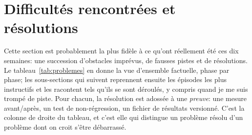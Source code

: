 \documentclass[11pt,a4paper]{article}
\begin{document}
\section{Difficultés rencontrées et résolutions}
\label{sec:problemes}

Cette section est probablement la plus fidèle à ce qu'ont réellement été ces dix semaines: une succession d'obstacles imprévus, de fausses pistes et de résolutions. Le tableau~\ref{tab:problemes} en donne la vue d'ensemble factuelle, phase par phase; les sous-sections qui suivent reprennent ensuite les épisodes les plus instructifs et les racontent tels qu'ils se sont déroulés, y compris quand je me suis trompé de piste. Pour chacun, la résolution est adossée à une \emph{preuve}: une mesure avant/après, un test de non-régression, un fichier de résultats versionné. C'est la colonne de droite du tableau, et c'est elle qui distingue un problème résolu d'un problème dont on croit s'être débarrassé.
\end{document}

